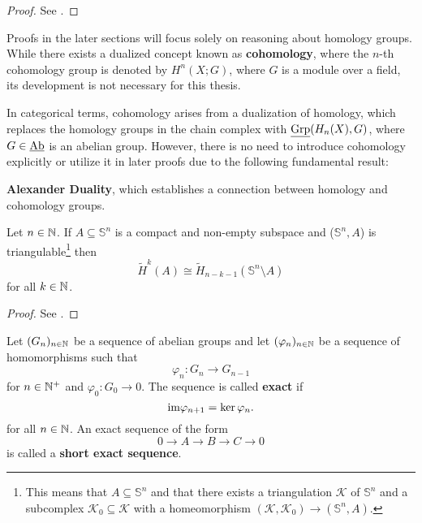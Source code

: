 \begin{proof}
  See \cite[Corollary 2.25]{hatcher}.
\end{proof}
\vspace*{-13pt}
Proofs in the later sections will focus solely on reasoning about homology groups. While there exists a dualized concept known as \textbf{cohomology}, where the $n$-th cohomology group is denoted by \( H^n(X; G) \), where \( G \) is a module over a field, its development is not necessary for this thesis.

In categorical terms, cohomology arises from a dualization of homology, which replaces the homology groups in the chain complex with \( \underline{\rm Grp}(H_n(X), G) \), where \( G \in \underline{\rm Ab} \) is an abelian group. However, there is no need to introduce cohomology explicitly or utilize it in later proofs due to the following fundamental result: 

\textbf{Alexander Duality}, which establishes a connection between homology and cohomology groups.

\begin{thm}\label{thm:alex}
  Let $n \in \mathbb{N}$. If $A \subseteq \mathbb{S}^n$ is a compact and non-empty subspace and ($\mathbb{S}^n, A$) is triangulable\footnote{This means that $A \subseteq \mathbb{S}^n$ and that there exists a triangulation $\mathcal{K}$ of $\mathbb{S}^n$ and a subcomplex $\mathcal{K}_0 \subseteq \mathcal{K}$ with a homeomorphism $(\mathcal{K}, \mathcal{K}_0) \to (\mathbb{S}^n, A)$.} then
  \begin{equation*}
    \tilde{H}^k(A) \cong \tilde{H}_{n-k-1}(\mathbb{S}^n \setminus A)
  \end{equation*}
  for all $k \in \mathbb{N}$.
\end{thm}

\begin{proof}
  See \cite[Theorem 71.1]{MunAlTop}.
\end{proof}

\begin{defin}
  Let $(G_n)_{n\in\mathbb{N}}$ be a sequence of abelian groups and let $(\varphi_n)_{n\in\mathbb{N}}$ be a sequence of homomorphisms such that
  \begin{equation*}
    \varphi_n\colon G_n \to G_{n-1}
  \end{equation*}
  for $n \in \mathbb{N}^+$ and $\varphi_0\colon G_0 \to 0$.
  The sequence is called \textbf{exact} if
  \begin{equation*}
    {\rm im}\varphi_{n+1} = \ker\varphi_n.
  \end{equation*}
  for all $n \in \mathbb{N}$.
  An exact sequence of the form
  \begin{equation*}
    0 \to A \to B \to C \to 0
  \end{equation*}
  is called a \textbf{short exact sequence}.
\end{defin}

